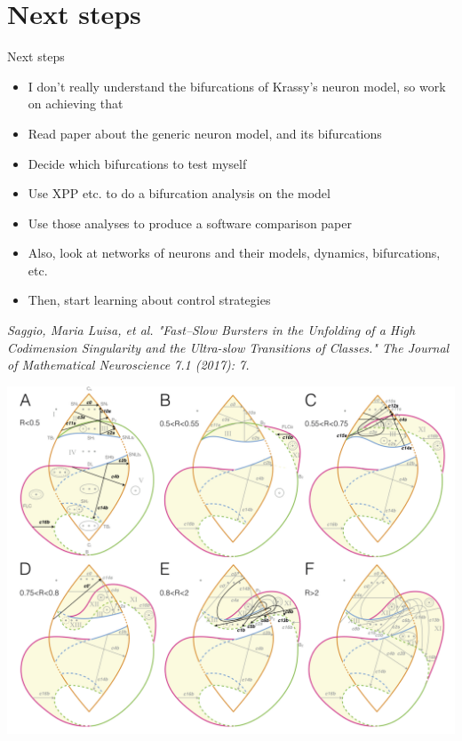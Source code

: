 \documentclass[,aspectratio=169]{beamer}
\begin{document}
\section{Next steps}
\label{sec:org2b86fa5}
\begin{frame}[label={sec:org0bd6118}]{Next steps}
\begin{itemize}
\item I don't really understand the bifurcations of Krassy's neuron model, so work on achieving that
\item Read paper about the generic neuron model, and its bifurcations
\item Decide which bifurcations to test myself
\item Use XPP etc. to do a bifurcation analysis on the model
\item Use those analyses to produce a software comparison paper
\item Also, look at networks of neurons and their models, dynamics, bifurcations, etc.
\item Then, start learning about control strategies
\end{itemize}

\emph{Saggio, Maria Luisa, et al. "Fast–Slow Bursters in the Unfolding of a High Codimension Singularity and the Ultra-slow Transitions of Classes." The Journal of Mathematical Neuroscience 7.1 (2017): 7.}


\end{frame}
\begin{frame}[plain]
\begin{center}
\includegraphics[height=1.3\textheight]{hardbif.png}
\end{center}
\end{frame}
\end{document}
